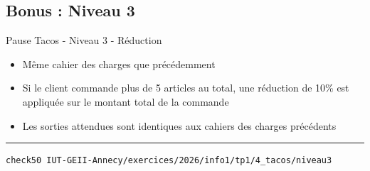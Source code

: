 \subsection{Bonus : Niveau 3}

\begin{UPSTIcahierDesCharges}{Pause Tacos - Niveau 3 - Réduction}
	\begin{itemize}
		\item[$\Box$] Même cahier des charges que précédemment
		\item[$\Box$] Si le client commande plus de 5 articles au total, une réduction de 10\% est appliquée sur le montant total de la commande
		\item[$\Box$] Les sorties attendues sont identiques aux cahiers des charges précédents
	\end{itemize}
	\hrule
	\begin{lstlisting}[language=bash,style=console]
check50 IUT-GEII-Annecy/exercices/2026/info1/tp1/4_tacos/niveau3
\end{lstlisting}
\end{UPSTIcahierDesCharges}